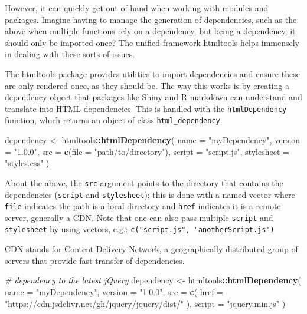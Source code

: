 \documentclass[10pt,]{krantz}
\makeatletter
\newenvironment{Shaded}{\begin{snugshade}}{\end{snugshade}}
\newcommand{\CommentTok}[1]{\textcolor[rgb]{0.37,0.37,0.37}{\textit{#1}}}
\newcommand{\DataTypeTok}[1]{\textcolor[rgb]{0.27,0.27,0.27}{#1}}
\newcommand{\KeywordTok}[1]{\textcolor[rgb]{0.27,0.27,0.27}{\textbf{#1}}}
\newcommand{\NormalTok}[1]{#1}
\newcommand{\OperatorTok}[1]{\textcolor[rgb]{0.43,0.43,0.43}{\textbf{#1}}}
\newcommand{\StringTok}[1]{\textcolor[rgb]{0.5,0.5,0.5}{#1}}
\newenvironment{kframe}{%
\medskip{}
\setlength{\fboxsep}{.8em}
 \def\at@end@of@kframe{}%
 \ifinner\ifhmode%
  \def\at@end@of@kframe{\end{minipage}}%
  \begin{minipage}{\columnwidth}%
 \fi\fi%
 \def\FrameCommand##1{\hskip\@totalleftmargin \hskip-\fboxsep
 \colorbox{shadecolor}{##1}\hskip-\fboxsep
     \hskip-\linewidth \hskip-\@totalleftmargin \hskip\columnwidth}%
 \MakeFramed {\advance\hsize-\width
   \@totalleftmargin\z@ \linewidth\hsize
   \@setminipage}}%
 {\par\unskip\endMakeFramed%
 \at@end@of@kframe}
\renewenvironment{Shaded}{\begin{kframe}}{\end{kframe}}
\newenvironment{rmdblock}[1]
  {
  \begin{itemize}
  \renewcommand{\labelitemi}{
    \raisebox{-.7\height}[0pt][0pt]{
      {\setkeys{Gin}{width=3em,keepaspectratio}\texttt{[image: images/\#1]}}
    }
  }
  \setlength{\fboxsep}{1em}
  \begin{kframe}
  \item
  }
  {
  \end{kframe}
  \end{itemize}
  }
\newenvironment{rmdnote}
  {\begin{rmdblock}{note}}
  {\end{rmdblock}}
\makeatother
\begin{document}
However, it can quickly get out of hand when working with modules and packages. Imagine having to manage the generation of dependencies, such as the above when multiple functions rely on a dependency, but being a dependency, it should only be imported once? The unified framework htmltools helps immensely in dealing with these sorts of issues.

The htmltools package provides utilities to import dependencies and ensure these are only rendered once, as they should be. The way this works is by creating a dependency object that packages like Shiny and R markdown can understand and translate into HTML dependencies. This is handled with the \texttt{htmlDependency} function, which returns an object of class \texttt{html\_dependency}.

\begin{Shaded}
\begin{Highlighting}[]
\NormalTok{dependency <-}\StringTok{ }\NormalTok{htmltools}\OperatorTok{::}\KeywordTok{htmlDependency}\NormalTok{(}
  \DataTypeTok{name =} \StringTok{"myDependency"}\NormalTok{,}
  \DataTypeTok{version =} \StringTok{"1.0.0"}\NormalTok{,}
  \DataTypeTok{src =} \KeywordTok{c}\NormalTok{(}\DataTypeTok{file =} \StringTok{"path/to/directory"}\NormalTok{),}
  \DataTypeTok{script =} \StringTok{"script.js"}\NormalTok{,}
  \DataTypeTok{stylesheet =} \StringTok{"styles.css"}
\NormalTok{)}
\end{Highlighting}
\end{Shaded}

About the above, the \texttt{src} argument points to the directory that contains the dependencies (\texttt{script} and \texttt{stylesheet}); this is done with a named vector where \texttt{file} indicates the path is a local directory and \texttt{href} indicates it is a remote server, generally a CDN. Note that one can also pass multiple \texttt{script} and \texttt{stylesheet} by using vectors, e.g.: \texttt{c("script.js",\ "anotherScript.js")}

\begin{rmdnote}
CDN stands for Content Delivery Network, a geographically distributed
group of servers that provide fast transfer of
dependencies.
\end{rmdnote}

\begin{Shaded}
\begin{Highlighting}[]
\CommentTok{# dependency to the latest jQuery}
\NormalTok{dependency <-}\StringTok{ }\NormalTok{htmltools}\OperatorTok{::}\KeywordTok{htmlDependency}\NormalTok{(}
  \DataTypeTok{name =} \StringTok{"myDependency"}\NormalTok{,}
  \DataTypeTok{version =} \StringTok{"1.0.0"}\NormalTok{,}
  \DataTypeTok{src =} \KeywordTok{c}\NormalTok{(}
    \DataTypeTok{href =} \StringTok{"https://cdn.jsdelivr.net/gh/jquery/jquery/dist/"}
\NormalTok{  ),}
  \DataTypeTok{script =} \StringTok{"jquery.min.js"}
\NormalTok{)}
\end{Highlighting}
\end{Shaded}
\end{document}
